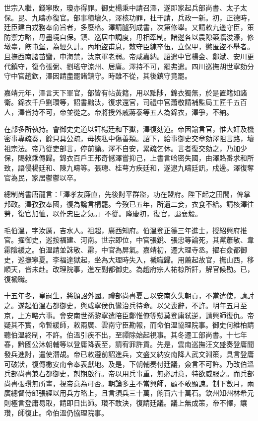 \begin{pinyinscope}
世宗入繼，錢寧敗，瓊亦得罪。御史楊秉中請召澤，遂即家起兵部尚書、太子太保。昆、九疇亦復官。部事積壞久，澤核功罪，杜干請，兵政一新。初，正德時，廷臣建白戎務奉俞旨者，多廢格。澤請臚列成書，次第修舉。又請敕九邊守臣，策防禦方略，毋畫境自保。鎮、巡居中調度，毋相牽制。諸邊各以農隙築牆浚濠，修墩臺，飭屯堡，為經久計。內地盜甫息，敕守臣練卒伍，立保甲，懲匿盜不舉者。且撫西南諸苗蠻，申海禁，汰京軍老弱。帝咸嘉納。詔遣中官楊金、鄭斌、安川更代鎮守，復令張弼、劉瑤守涼州、居庸。澤持不可，罷弗遣。四川巡撫胡世寧劾分守中官趙欽，澤因請盡罷諸鎮守。時雖不從，其後鎮守竟罷。

嘉靖元年，澤言天下軍官，部皆有帖黃籍，用以黜陟，錦衣獨無，於是置籍如諸衛。錦衣千戶劉瓚等，詔書黜汰，復求還官，司禮中官蕭敬請補監局工匠千五百人，澤皆持不可，帝並從之。帝將授外戚蔣泰等五人為錦衣，澤爭，不納。

在部多所執持。會御史史道以訐楊廷和下獄，澤復劾道。帝因諭言官，惟大奸及機密事專疏奏，餘只具公疏，毋挾私中傷善類。詔下，給事御史交章劾澤阻言路，壞祖宗法。帝乃從吏部言，停前諭。澤不自安，累疏乞休。言者復交劾之，乃加少保，賜敕乘傳歸。錦衣百戶王邦奇憾澤嘗抑己，上書言哈密失國，由澤賂番求和所致，語侵楊廷和、陳九疇等。張璁、桂萼方疾廷和，遂逮九疇廷訊，戍邊。澤復奪官為民，家居鬱鬱以卒。

總制尚書唐龍言：「澤孝友廉直，先後討平群盜，功在盟府。陛下起之田間，俾掌邦政。澤孜孜奉國，復為讒言構罷。今歿已五年，所遺二妾，衣食不給。請核澤往勞，復官加恤，以作忠臣之氣。」不從。隆慶初，復官，謚襄毅。

毛伯溫，字汝厲，吉水人。祖超，廣西知府。伯溫登正德三年進士，授紹興府推官。擢御史，巡按福建、河南。世宗即位，中官張銳、張忠等論死，其黨蕭敬、韋霦陰緩之。伯溫請並誅敬、霦，中官為屏氣。嘉靖初，遷大理寺丞。擢右僉都御史，巡撫寧夏。李福達獄起，坐為大理時失入，褫職歸。用薦起故官，撫山西，移順天，皆未赴。改理院事，進左副都御史。為趙府宗人祐椋所訐，解官候勘。已，復褫職。

十五年冬，皇嗣生，將頒詔外國。禮部尚書夏言以安南久失朝貢，不當遣使，請討之。遂起伯溫右都御史，與咸寧侯仇鸞治兵待命。以父喪辭，不許。明年五月至京，上方略六事。會安南世孫黎寧遣陪臣鄭惟僚等愬莫登庸弒逆，請興師復仇。帝疑其不實，命暫緩師，敕兩廣、雲南守臣勘報，而命伯溫協理院事。御史何維柏請聽伯溫終制，不許。伯溫引疾不出，至禫除始起視事。其冬遷工部尚書。十七年春，黔國公沐朝輔等以登庸降表至，請宥罪許貢。先是，雲南巡撫汪文盛奏登庸聞發兵進討，遣使潛覘。帝已敕遵前詔進兵，文盛又納安南降人武文淵策，具言登庸可破狀，復傳檄安南令奉表獻地。及是，下朝輔奏付廷議，僉言不可許。乃改伯溫兵部尚書兼右都御史，剋期啟行。帝以用兵事重，無必討意，特欲威服之。而兵部尚書張瓚無所畫，視帝意為可否。朝論多主不當興師，顧不敢顯諫。制下數月，兩廣總督侍郎張經以用兵方略上，且言須兵三十萬，餉百六十萬石。欽州知州林希元則極言登庸易取，請即日出師。瓚不敢決，復請廷議。議上無成策，帝不懌，讓瓚，師復止。命伯溫仍協理院事。


\end{pinyinscope}
